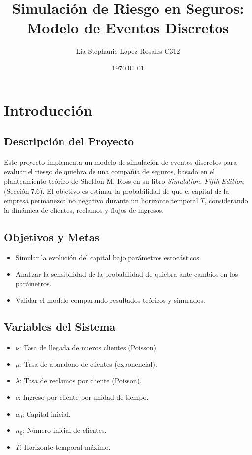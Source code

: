 \documentclass{article}
\title{Simulación de Riesgo en Seguros: Modelo de Eventos Discretos}
\author{Lia Stephanie López Rosales C312}
\date{\today}
\begin{document}
\maketitle

\section{Introducción}
\subsection{Descripción del Proyecto}
Este proyecto implementa un modelo de simulación de eventos discretos para evaluar el riesgo de quiebra de una compañía de seguros, basado en el planteamiento teórico de Sheldon M. Ross en su libro \textit{Simulation, Fifth Edition} (Sección 7.6). El objetivo es estimar la probabilidad de que el capital de la empresa permanezca no negativo durante un horizonte temporal \( T \), considerando la dinámica de clientes, reclamos y flujos de ingresos.

\subsection{Objetivos y Metas}
\begin{itemize}
    \item Simular la evolución del capital bajo parámetros estocásticos.
    \item Analizar la sensibilidad de la probabilidad de quiebra ante cambios en los parámetros.
    \item Validar el modelo comparando resultados teóricos y simulados.
\end{itemize}

\subsection{Variables del Sistema}
\begin{itemize}
    \item \( \nu \): Tasa de llegada de nuevos clientes (Poisson).
    \item \( \mu \): Tasa de abandono de clientes (exponencial).
    \item \( \lambda \): Tasa de reclamos por cliente (Poisson).
    \item \( c \): Ingreso por cliente por unidad de tiempo.
    \item \( a_0 \): Capital inicial.
    \item \( n_0 \): Número inicial de clientes.
    \item \( T \): Horizonte temporal máximo.
\end{itemize}
\end{document}
